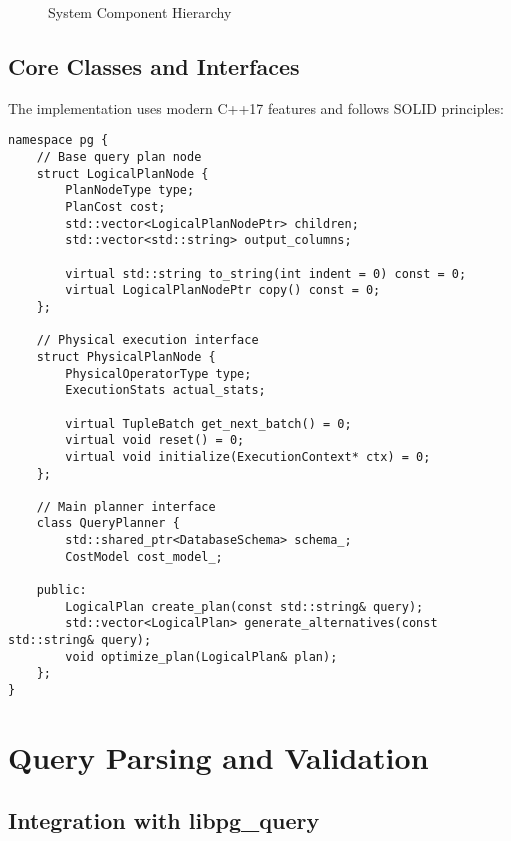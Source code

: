 \documentclass[12pt,a4paper]{article}
\begin{document}
\begin{figure}[htbp]
        \caption{System Component Hierarchy}
        \label{fig:components}
    \end{figure}

    \subsection{Core Classes and Interfaces}

    The implementation uses modern C++17 features and follows SOLID principles:

    \begin{lstlisting}[style=cpp, caption=Core Interface Definitions]
namespace pg {
    // Base query plan node
    struct LogicalPlanNode {
        PlanNodeType type;
        PlanCost cost;
        std::vector<LogicalPlanNodePtr> children;
        std::vector<std::string> output_columns;

        virtual std::string to_string(int indent = 0) const = 0;
        virtual LogicalPlanNodePtr copy() const = 0;
    };

    // Physical execution interface
    struct PhysicalPlanNode {
        PhysicalOperatorType type;
        ExecutionStats actual_stats;

        virtual TupleBatch get_next_batch() = 0;
        virtual void reset() = 0;
        virtual void initialize(ExecutionContext* ctx) = 0;
    };

    // Main planner interface
    class QueryPlanner {
        std::shared_ptr<DatabaseSchema> schema_;
        CostModel cost_model_;

    public:
        LogicalPlan create_plan(const std::string& query);
        std::vector<LogicalPlan> generate_alternatives(const std::string& query);
        void optimize_plan(LogicalPlan& plan);
    };
}
    \end{lstlisting}

    \section{Query Parsing and Validation}

    \subsection{Integration with libpg\_query}
\end{document}
